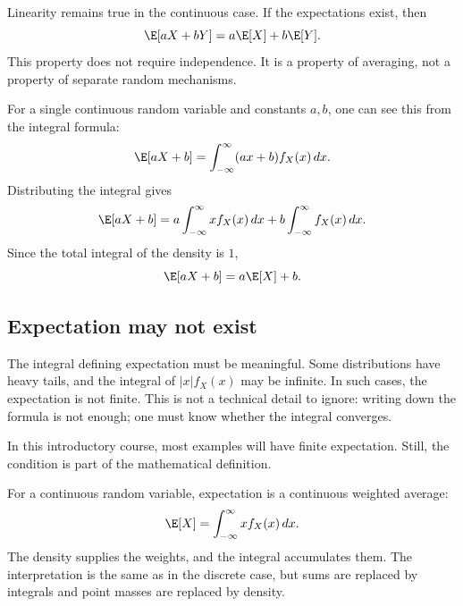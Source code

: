 Linearity remains true in the continuous case. If the expectations exist, then
\[
\E[aX+bY]=a\E[X]+b\E[Y].
\]
This property does not require independence. It is a property of averaging, not
a property of separate random mechanisms.

For a single continuous random variable and constants \(a,b\), one can see this
from the integral formula:
\[
\E[aX+b]=\int_{-\infty}^{\infty}(ax+b)f_X(x)\,dx.
\]
Distributing the integral gives
\[
\E[aX+b]=a\int_{-\infty}^{\infty}x f_X(x)\,dx
+b\int_{-\infty}^{\infty}f_X(x)\,dx.
\]
Since the total integral of the density is \(1\),
\[
\E[aX+b]=a\E[X]+b.
\]

\subsection*{Expectation may not exist}

The integral defining expectation must be meaningful. Some distributions have
heavy tails, and the integral of \(|x|f_X(x)\) may be infinite. In such cases,
the expectation is not finite. This is not a technical detail to ignore: writing
down the formula is not enough; one must know whether the integral converges.

In this introductory course, most examples will have finite expectation. Still,
the condition is part of the mathematical definition.

\begin{summarybox}
For a continuous random variable, expectation is a continuous weighted average:
\[
\E[X]=\int_{-\infty}^{\infty}x f_X(x)\,dx.
\]
The density supplies the weights, and the integral accumulates them. The
interpretation is the same as in the discrete case, but sums are replaced by
integrals and point masses are replaced by density.
\end{summarybox}
